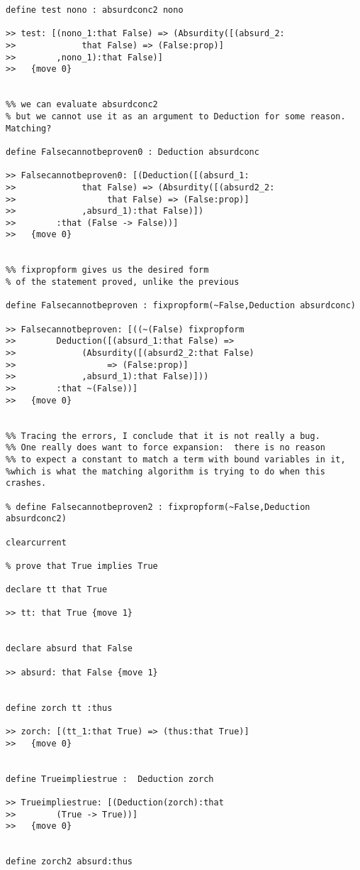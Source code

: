 \documentclass[12pt]{article}
\begin{document}
\begin{verbatim}
define test nono : absurdconc2 nono

>> test: [(nono_1:that False) => (Absurdity([(absurd_2:
>>             that False) => (False:prop)]
>>        ,nono_1):that False)]
>>   {move 0}


%% we can evaluate absurdconc2 
% but we cannot use it as an argument to Deduction for some reason.  Matching?

define Falsecannotbeproven0 : Deduction absurdconc

>> Falsecannotbeproven0: [(Deduction([(absurd_1:
>>             that False) => (Absurdity([(absurd2_2:
>>                  that False) => (False:prop)]
>>             ,absurd_1):that False)])
>>        :that (False -> False))]
>>   {move 0}


%% fixpropform gives us the desired form 
% of the statement proved, unlike the previous

define Falsecannotbeproven : fixpropform(~False,Deduction absurdconc)

>> Falsecannotbeproven: [((~(False) fixpropform 
>>        Deduction([(absurd_1:that False) => 
>>             (Absurdity([(absurd2_2:that False) 
>>                  => (False:prop)]
>>             ,absurd_1):that False)]))
>>        :that ~(False))]
>>   {move 0}


%% Tracing the errors, I conclude that it is not really a bug.  
%% One really does want to force expansion:  there is no reason
%% to expect a constant to match a term with bound variables in it, 
%which is what the matching algorithm is trying to do when this crashes.

% define Falsecannotbeproven2 : fixpropform(~False,Deduction absurdconc2)

clearcurrent

% prove that True implies True

declare tt that True

>> tt: that True {move 1}


declare absurd that False

>> absurd: that False {move 1}


define zorch tt :thus

>> zorch: [(tt_1:that True) => (thus:that True)]
>>   {move 0}


define Trueimpliestrue :  Deduction zorch

>> Trueimpliestrue: [(Deduction(zorch):that 
>>        (True -> True))]
>>   {move 0}


define zorch2 absurd:thus


\end{verbatim}
\end{document}
